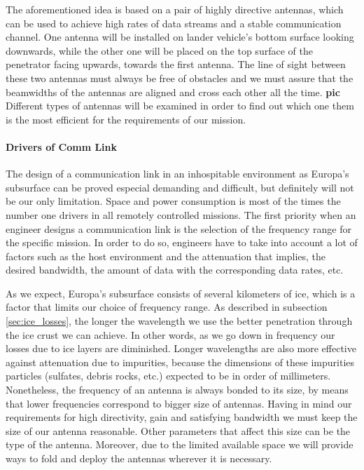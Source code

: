 The aforementioned idea is based on a pair of highly directive antennas, which can be used to achieve high rates of data streams and a stable communication channel. One antenna will be installed on lander vehicle's bottom surface looking downwards, while the other one will be placed on the top surface of the penetrator facing upwards, towards the first antenna. The line of sight between these two antennas must always be free of obstacles and we must assure that the beamwidths of the antennas are aligned and cross each other all the time. \textbf{pic} Different types of antennas will be examined in order to find out which one them is the most efficient for the requirements of our mission.

\paragraph{Drivers of Comm Link}
The design of a communication link in an inhospitable environment as Europa's subsurface can be proved especial demanding and difficult, but definitely will not be our only limitation. Space and power consumption is most of the times the number one drivers in all remotely controlled missions. The first priority when an engineer designs a communication link is the selection of the frequency range for the specific mission. In order to do so, engineers have to take into account a lot of factors such as the host environment and the attenuation that implies, the desired bandwidth, the amount of data with the corresponding data rates, etc. 

As we expect, Europa's subsurface consists of several kilometers of ice, which is a factor that limits our choice of frequency range. As described in subsection \ref{sec:ice_losses}, the longer the wavelength we use the better penetration through the ice crust we can achieve. In other words, as we go down in frequency our losses due to ice layers are diminished. Longer wavelengths are also more effective against attenuation due to impurities, because the dimensions of these impurities particles (sulfates, debris rocks, etc.) expected to be in order of millimeters. Nonetheless, the frequency of an antenna is always bonded to its size, by means that lower frequencies correspond to bigger size of antennas. Having in mind our requirements for high directivity, gain and satisfying bandwidth we must keep the size of our antenna reasonable. Other parameters that affect this size can be the type of the antenna. Moreover, due to the limited available space we will provide ways to fold and deploy the antennas wherever it is necessary.  

